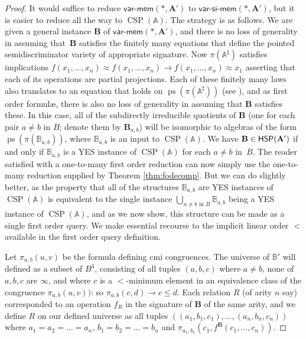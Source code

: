 \documentclass[reqno]{amsart}
\theoremstyle{plain}
\theoremstyle{definition}
\newcommand{\varmem}{\textsf{var-mem}}
\newcommand{\varsimem}{\textsf{var-si-mem}}
\newcommand{\ps}{\operatorname{ps}}
\newcommand{\CSP}{\operatorname{CSP}}
\begin{document}
\begin{proof}
It would suffice to reduce $\varmem(*,\mathbf{A}')$ to $\varsimem(*,\mathbf{A}')$, but it is easier to reduce all the way to $\CSP(\mathbb{A})$.  
The strategy is as follows.  We are given a general instance $\mathbf{B}$ of $\varmem(*,\mathbf{A}')$, and there is no loss of generality in assuming that~$\mathbf{B}$ satisfies the finitely many equations that define the pointed semidiscriminator variety of appropriate signature.  
Now $\pi(\mathbb{A}^\sharp)$ satisfies implications $f(x_1,\dots,x_n)\approx f(x_1,\dots,x_n)\rightarrow f(x_1,\dots,x_n)\approx x_1$ asserting that each of its operations are partial projections.  
Each of these finitely many laws also translates to an equation that holds on $\ps(\pi(\mathbb{A}^\sharp))$ (see \cite[Lemma 5.9]{jac:flat}), and as first order formul{\ae}, there is also no loss of generality in assuming that $\mathbf{B}$ satisfies these.  
In this case, all of the subdirectly irreducible quotients of $\mathbf{B}$ (one for each pair $a\neq b$ in $B$; denote them by $\mathbf{B}_{a,b}$) will be isomorphic to algebras of the form $\ps(\pi(\mathbb{B}_{a,b}))$, where $\mathbb{B}_{a,b}$ is an input to $\CSP(\mathbb{A})$.  
We have $\mathbf{B}\in \mathsf{HSP}({\bf A}')$ if and only if $\mathbb{B}_{a,b}$ is a YES instance of $\CSP(\mathbb{A})$ for each $a\neq b$ in~$B$.  
The reader satisfied with a one-to-many first order reduction can now simply use the one-to-many reduction supplied by Theorem \ref{thm:fodecomp}.  
But we can do slightly better, as the property that all of the structures $\mathbb{B}_{a,b}$ are YES instances of  $\CSP(\mathbb{A})$ is equivalent to the single instance $\dot\bigcup_{a\neq b\text{ in }B}\mathbb{B}_{a,b}$ being a YES instance of $\CSP(\mathbb{A})$, and as we now show, this structure can be made as a single first order query.  
We make essential recourse to the implicit linear order $<$ available in the first order query definition. 

Let $\pi_{a,b}(u,v)$ be the formula defining cmi congruences.  The universe of $\mathbb{B}'$ will defined as a subset of $B^3$, consisting of all tuples $(a,b,c)$ where $a\neq b$, none of $a,b,c$ are $\infty$, and where $c$ is a $<$-minimum element in an equivalence class of the congruence $\pi_{a,b}(u,v))$: so $\pi_{a,b}(c,d)\rightarrow c\leq d$.  Each relation $R$ (of arity $n$ say) corresponded to an operation $f_R$ in the signature of $\mathbf{B}$ of the same arity, and we define $R$ on our defined universe as all tuples 
$((a_1,b_1,c_1),\dots,(a_n,b_n,c_n))$ where $a_1=a_2=\dots=a_n$, $b_1=b_2=\dots=b_n$ and $\pi_{a_1,b_1}(c_1,f^\mathbf{B}(c_1,\dots,c_n))$.  
\end{proof}
\end{document}
